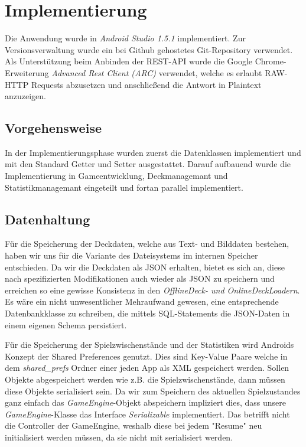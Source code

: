 \chapter{Implementierung}
\label{cha:implementierung}


Die Anwendung wurde in \emph{Android Studio 1.5.1} implementiert. Zur Versionsverwaltung wurde ein bei Github gehostetes Git-Repository verwendet. Als Unterstützung beim Anbinden der REST-API wurde die Google Chrome-Erweiterung \emph{Advanced Rest Client (ARC)} verwendet, welche es erlaubt RAW-HTTP Requests abzusetzen und anschließend die Antwort in Plaintext anzuzeigen.

\section{Vorgehensweise}
In der Implementierungsphase wurden zuerst die Datenklassen implementiert und mit den Standard Getter und Setter ausgestattet. Darauf aufbauend wurde die Implementierung in Gameentwicklung, Deckmanagemant und Statistikmanagemant eingeteilt und fortan parallel implementiert. 


\section{Datenhaltung}
Für die Speicherung der Deckdaten, welche aus Text- und Bilddaten bestehen, haben wir uns für die Variante des Dateisystems im internen Speicher entschieden. Da wir die Deckdaten als JSON erhalten, bietet es sich an, diese nach spezifizierten Modifikationen auch wieder als JSON zu speichern und erreichen so eine gewisse Konsistenz in den \emph{OfflineDeck- und OnlineDeckLoadern}. Es wäre ein nicht unwesentlicher Mehraufwand gewesen, eine entsprechende Datenbankklasse zu schreiben, die mittels SQL-Statements die JSON-Daten in einem eigenen Schema persistiert. 

Für die Speicherung der Spielzwischenstände und der Statistiken wird Androids Konzept der Shared Preferences genutzt. Dies sind Key-Value Paare welche in dem \emph{shared\_prefs} Ordner einer jeden App als XML gespeichert werden. Sollen Objekte abgespeichert werden wie z.B. die Spielzwischenstände, dann müssen diese Objekte serialisiert sein. Da wir zum Speichern des aktuellen Spielzustandes ganz einfach das \emph{GameEngine}-Objekt abspeichern impliziert dies, dass unsere \emph{GameEngine}-Klasse das Interface \emph{Serializable} implementiert. Das betrifft nicht die Controller der GameEngine, weshalb diese bei jedem "Resume" neu initialisiert werden müssen, da sie nicht mit serialisiert werden.

